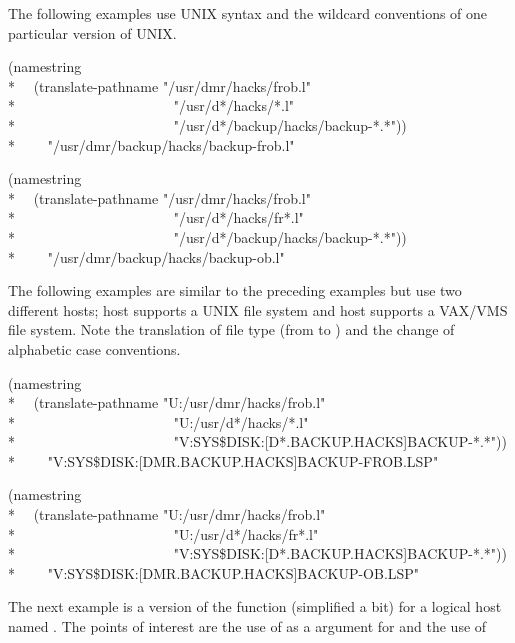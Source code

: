 The following examples use UNIX syntax and the wildcard conventions of one
particular version of UNIX.
\begin{lisp}
(namestring \\*
~~(translate-pathname "/usr/dmr/hacks/frob.l" \\*
~~~~~~~~~~~~~~~~~~~~~~"/usr/d*/hacks/*.l" \\*
~~~~~~~~~~~~~~~~~~~~~~"/usr/d*/backup/hacks/backup-*.*")) \\*
~~~\EV\ "/usr/dmr/backup/hacks/backup-frob.l"
\end{lisp}
\goodbreak
\begin{lisp}
(namestring \\*
~~(translate-pathname "/usr/dmr/hacks/frob.l" \\*
~~~~~~~~~~~~~~~~~~~~~~"/usr/d*/hacks/fr*.l" \\*
~~~~~~~~~~~~~~~~~~~~~~"/usr/d*/backup/hacks/backup-*.*")) \\*
~~~\EV\ "/usr/dmr/backup/hacks/backup-ob.l"
\end{lisp}
The following examples are similar to the preceding examples
but use two different hosts; host  supports a UNIX file system
and host  supports a VAX/VMS file system.  Note the translation
of file type (from  to ) and the change of alphabetic case conventions.
\begin{lisp}
(namestring \\*
~~(translate-pathname "U:/usr/dmr/hacks/frob.l" \\*
~~~~~~~~~~~~~~~~~~~~~~"U:/usr/d*/hacks/*.l" \\*
~~~~~~~~~~~~~~~~~~~~~~"V:SYS\$DISK:[D*.BACKUP.HACKS]BACKUP-*.*")) \\*
~~~\EV\ "V:SYS\$DISK:[DMR.BACKUP.HACKS]BACKUP-FROB.LSP"
\end{lisp}
\begin{lisp}
(namestring \\*
~~(translate-pathname "U:/usr/dmr/hacks/frob.l" \\*
~~~~~~~~~~~~~~~~~~~~~~"U:/usr/d*/hacks/fr*.l" \\*
~~~~~~~~~~~~~~~~~~~~~~"V:SYS\$DISK:[D*.BACKUP.HACKS]BACKUP-*.*")) \\*
~~~\EV\ "V:SYS\$DISK:[DMR.BACKUP.HACKS]BACKUP-OB.LSP"
\end{lisp}
The next example is a version of the
function  (simplified a bit) for a logical host named .
The points of interest are the use of  as
a  argument for  and the use of 
